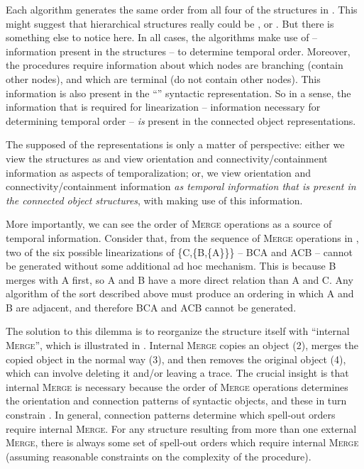   Each algorithm generates the same order from all four of the structures in {}. This might suggest that hierarchical structures really could be , or . But there is something else to notice here. In all cases, the  algorithms make use of  -- information present in the structures -- to determine temporal order. Moreover, the procedures require information about which nodes are branching (contain other nodes), and which are terminal (do not contain other nodes). This information is also present in the “” syntactic representation. So in a sense, the information that is required for linearization -- information necessary for determining temporal order -- \textit{is} present in the connected object representations. 

  The supposed  of the representations is only a matter of perspective: either we view the structures as  and view orientation and connectivity/containment information as aspects of temporalization; or, we view orientation and connectivity/containment information \textit{as temporal information that is present in the connected object structures}, with  making use of this information. 

  More importantly, we can see the order of \textsc{Merge} operations as a source of temporal information. Consider that, from the sequence of \textsc{Merge} operations in {}, two of the six possible linearizations of \{C,\{B,\{A\}\}\} -- BCA and ACB -- cannot be generated without some additional ad hoc mechanism. This is because B merges with A first, so A and B have a more direct relation than A and C. Any  algorithm of the sort described above must produce an ordering in which A and B are adjacent, and therefore BCA and ACB cannot be generated.

  The solution to this dilemma is to reorganize the structure itself with “internal \textsc{Merge}”, which is illustrated in {}. Internal \textsc{Merge} copies an object (2), merges the copied object in the normal way (3), and then removes the original object (4), which can involve deleting it and/or leaving a trace. The crucial insight is that internal \textsc{Merge} is necessary because the order of \textsc{Merge} operations determines the orientation and connection patterns of syntactic objects, and these in turn constrain . In general, connection patterns determine which spell-out orders require internal \textsc{Merge}. For any structure resulting from more than one external \textsc{Merge}, there is always some set of spell-out orders which require internal \textsc{Merge} (assuming reasonable constraints on the complexity of the  procedure).

